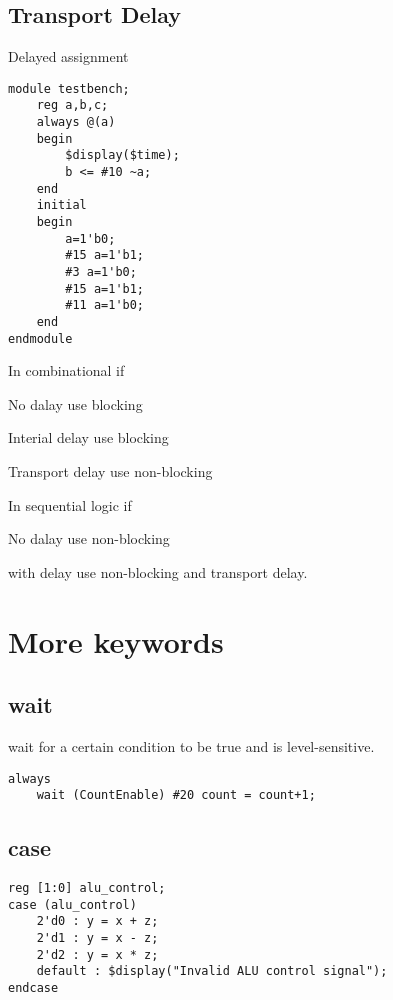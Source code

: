 \subsection{Transport Delay}
Delayed assignment

\begin{lstlisting}
module testbench;
    reg a,b,c;
    always @(a)
    begin
        $display($time);
        b <= #10 ~a;
    end
    initial
    begin
        a=1'b0;
        #15 a=1'b1;
        #3 a=1'b0;
        #15 a=1'b1;
        #11 a=1'b0;
    end
endmodule
\end{lstlisting}

In combinational if
\begin{definition}
    \item [No dalay] use blocking
    \item [Interial delay] use blocking
    \item [Transport delay] use non-blocking
\end{definition}

In sequential logic if
\begin{definition}
    \item [No dalay] use non-blocking
    \item [with delay] use non-blocking and transport delay.
\end{definition}

\section{More keywords}
\subsection{wait}
wait for a certain condition to be true and is level-sensitive.
\begin{lstlisting}
always
    wait (CountEnable) #20 count = count+1;
\end{lstlisting}

\subsection{case}

\begin{lstlisting}
reg [1:0] alu_control;
case (alu_control)
    2'd0 : y = x + z;
    2'd1 : y = x - z;
    2'd2 : y = x * z;
    default : $display("Invalid ALU control signal");
endcase
\end{lstlisting}

